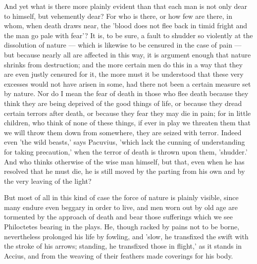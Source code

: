  And yet what is there more plainly evident than that each man is not only dear to himself, but vehemently dear? For who is there, or how few are there, in whom, when death draws near, the 'blood does not flee back in timid fright and the man go pale with fear'? It is, to be sure, a fault to shudder so violently at the dissolution of nature — which is likewise to be censured in the case of pain — but because nearly all are affected in this way, it is argument enough that nature shrinks from destruction; and the more certain men do this in a way that they are even justly censured for it, the more must it be understood that these very excesses would not have arisen in some, had there not been a certain measure set by nature. Nor do I mean the fear of death in those who flee death because they think they are being deprived of the good things of life, or because they dread certain terrors after death, or because they fear they may die in pain; for in little children, who think of none of these things, if ever in play we threaten them that we will throw them down from somewhere, they are seized with terror. Indeed even 'the wild beasts,' says Pacuvius, 'which lack the cunning of understanding for taking precaution,' when the terror of death is thrown upon them, 'shudder.' And who thinks otherwise of the wise man himself, but that, even when he has resolved that he must die, he is still moved by the parting from his own and by the very leaving of the light?

 But most of all in this kind of case the force of nature is plainly visible, since many endure even beggary in order to live, and men worn out by old age are tormented by the approach of death and bear those sufferings which we see Philoctetes bearing in the plays. He, though racked by pains not to be borne, nevertheless prolonged his life by fowling, and 'slow, he transfixed the swift with the stroke of his arrows; standing, he transfixed those in flight,' as it stands in Accius, and from the weaving of their feathers made coverings for his body.

